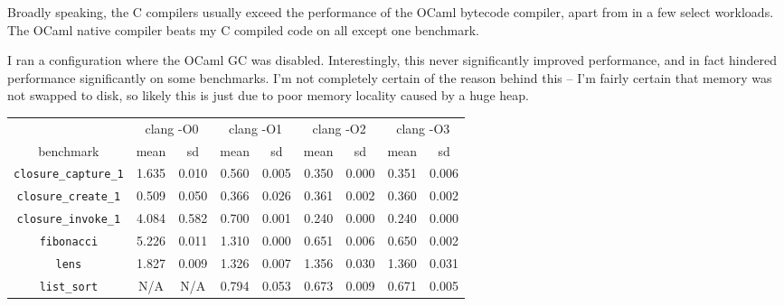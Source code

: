 \documentclass[12pt,a4paper,twoside,openright]{report}
\begin{document}
Broadly speaking, the C compilers usually exceed the performance of the OCaml
bytecode compiler, apart from in a few select workloads. The OCaml native
compiler beats my C compiled code on all except one benchmark.

I ran a configuration where the OCaml GC was disabled.
Interestingly, this never significantly improved performance, and in fact hindered
performance significantly on some benchmarks. I'm not completely certain of the
reason behind this -- I'm fairly certain that memory was not swapped to disk,
so likely this is just due to poor memory locality caused by a huge heap.


\begin{table}[h]
  \centering
  \small
\begin{tabular}{| c | c c | c c | c c | c c |}
  \hline
  & \multicolumn{2}{c|}{clang -O0}
  & \multicolumn{2}{c|}{clang -O1}
  & \multicolumn{2}{c|}{clang -O2}
  & \multicolumn{2}{c|}{clang -O3}
  \\
benchmark                     & mean  & sd    & mean  & sd    & mean  & sd    & mean  & sd \\
  \hline
\lstinline!closure_capture_1! & \cellcolor[hsb]{0.3,0.097,1}1.635 & 0.010 & \cellcolor[hsb]{0.3,0.691,1}0.560 & 0.005 & \cellcolor[hsb]{0.3,0.807,1}0.350 & 0.000 & \cellcolor[hsb]{0.3,0.806,1}0.351 & 0.006 \\
\lstinline!closure_create_1!  & \cellcolor[hsb]{0.0,1.000,1}0.509 & 0.050 & \cellcolor[hsb]{0.0,0.642,1}0.366 & 0.026 & \cellcolor[hsb]{0.0,0.626,1}0.361 & 0.002 & \cellcolor[hsb]{0.0,0.625,1}0.360 & 0.002 \\
\lstinline!closure_invoke_1!  & \cellcolor[hsb]{0.0,0.432,1}4.084 & 0.582 & \cellcolor[hsb]{0.3,0.680,1}0.700 & 0.001 & \cellcolor[hsb]{0.3,0.890,1}0.240 & 0.000 & \cellcolor[hsb]{0.3,0.890,1}0.240 & 0.000 \\
\lstinline!fibonacci!         & \cellcolor[hsb]{0.0,0.326,1}5.226 & 0.011 & \cellcolor[hsb]{0.3,0.586,1}1.310 & 0.000 & \cellcolor[hsb]{0.3,0.794,1}0.651 & 0.006 & \cellcolor[hsb]{0.3,0.794,1}0.650 & 0.002 \\
\lstinline!lens!              & \cellcolor[hsb]{0.0,1.000,1}1.827 & 0.009 & \cellcolor[hsb]{0.0,1.000,1}1.326 & 0.007 & \cellcolor[hsb]{0.0,1.000,1}1.356 & 0.030 & \cellcolor[hsb]{0.0,1.000,1}1.360 & 0.031 \\
\lstinline!list_sort!         &                                N/A &    N/A & \cellcolor[hsb]{0.3,0.292,1}0.794 & 0.053 & \cellcolor[hsb]{0.3,0.400,1}0.673 & 0.009 & \cellcolor[hsb]{0.0,0.402,1}0.671 & 0.005 \\

\end{tabular}
\end{table}
\end{document}
